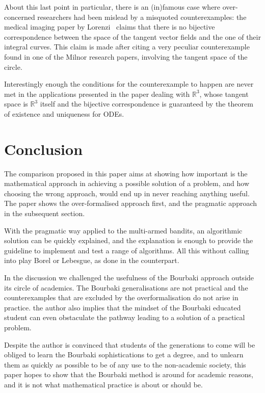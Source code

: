 \documentclass[]{scrartcl}
\theoremstyle{definition}
\begin{document}
About this last point in particular, there is an (in)famous case where over-concerned researchers had been mislead by a misquoted counterexamples: the medical imaging paper by Lorenzi~\cite{lorenzi2013geodesics} claims that there is no bijective correspondence between the space of the tangent vector fields and the one of their integral curves. This claim is made after citing a very peculiar counterexample found in one of the Milnor research papers, involving the tangent space of the circle.

Interestingly enough the conditions for the counterexample to happen are never met in the applications presented in the paper dealing with $\mathbb{R}^3$, whose tangent space is $\mathbb{R}^3$ itself and the bijective correspondence is guaranteed by the theorem of existence and uniqueness for ODEs.


\section{Conclusion}

The comparison proposed in this paper aims at showing how important is the mathematical approach in achieving a possible solution of a problem, and how choosing the wrong approach, would end up in never reaching anything useful. The paper shows the over-formalised approach first, and the pragmatic approach in the subsequent section.

With the pragmatic way applied to the multi-armed bandits, an algorithmic solution can be quickly explained, and the explanation is enough to provide the guideline to implement and test a range of algorithms. All this without calling into play Borel or Lebesgue, as done in the counterpart.

In the discussion we challenged the usefulness of the Bourbaki approach outside its circle of academics. The Bourbaki generalisations are not practical and the counterexamples that are excluded by the overformalisation do not arise in practice. the author also implies that the mindset of the Bourbaki educated student can even obstaculate the pathway leading to a solution of a practical problem.

Despite the author is convinced that students of the generations to come will be obliged to learn the Bourbaki sophistications to get a degree, and to unlearn them as quickly as possible to be of any use to the non-academic society, this paper hopes to show that the Bourbaki method is around for academic reasons, and it is not what mathematical practice is about or should be. %


 

\end{document}
